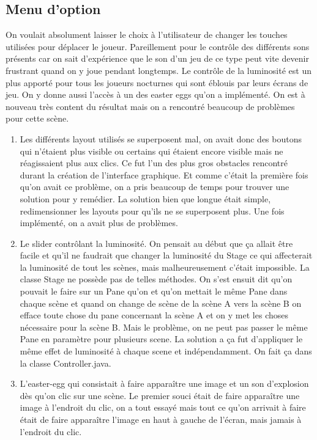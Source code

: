 \documentclass[../main.tex]{subfiles}
\begin{document}
\subsection{Menu d'option}
On voulait absolument laisser le choix à l'utilisateur de changer les touches utilisées pour déplacer le joueur.
Pareillement pour le contrôle des différents sons présents car on sait d’expérience que le son d’un jeu de ce type peut vite devenir frustrant quand on y joue pendant longtemps.
Le contrôle de la luminosité est un plus apporté pour tous les joueurs nocturnes qui sont éblouis par leurs écrans de jeu.
On y donne aussi l’accès à un des easter eggs qu’on a implémenté.
On est à nouveau très content du résultat mais on a rencontré beaucoup de problèmes pour cette scène.
\begin{enumerate}
    \item Les différents layout utilisés se superposent mal, on avait donc des boutons qui n'étaient plus visible ou certains qui étaient encore visible mais ne réagissaient plus aux clics.
Ce fut l’un des plus gros obstacles rencontré durant la création de l’interface graphique. 
Et comme c'était la première fois qu’on avait ce problème, on a pris beaucoup de temps pour trouver une solution pour y remédier. 
La solution bien que longue était simple, redimensionner les layouts pour qu’ils ne se superposent plus.
Une fois implémenté, on a avait plus de problèmes.
    \item Le slider contrôlant la luminosité.
On pensait au début que ça allait être facile et qu’il ne faudrait que changer la luminosité du Stage ce qui affecterait la luminosité de tout les scènes, mais malheureusement c'était impossible.
La classe Stage ne possède pas de telles méthodes.
On s’est ensuit dit qu’on pouvait le faire sur un Pane qu’on et qu'on mettait le même Pane dans chaque scène et quand on change de scène de la scène A vers la scène B on efface toute chose du pane concernant la scène A et on y met les choses nécessaire pour la scène B.
Mais le problème, on ne peut pas passer le même Pane en paramètre pour plusieurs scene.
La solution a ça fut d'appliquer le même effet de luminosité à chaque scene et indépendamment. On fait ça dans la classe Controller.java.
    \item L’easter-egg qui consistait à faire apparaître une image et un son d’explosion dès qu’on clic sur une scène.
Le premier souci était de faire apparaître une image à l'endroit du clic, on a tout essayé mais tout ce qu’on arrivait à faire était de faire apparaître l’image en haut à gauche de l’écran, mais jamais à l'endroit du clic.

\end{enumerate}
\end{document}
